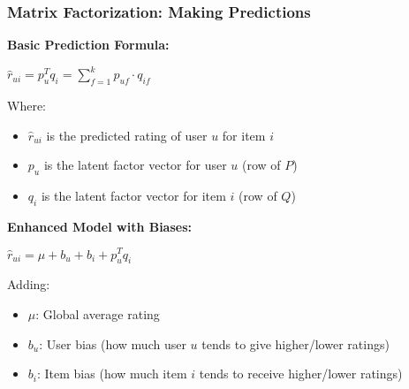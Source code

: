 \documentclass{beamer}
\begin{document}
\begin{frame}
\frametitle{Matrix Factorization: Making Predictions}

\textbf{Basic Prediction Formula:}
\begin{center}
\Large
$\hat{r}_{ui} = p_u^T q_i = \sum_{f=1}^k p_{uf} \cdot q_{if}$
\end{center}

\vspace{0.3cm}
Where:
\begin{itemize}
    \item $\hat{r}_{ui}$ is the predicted rating of user $u$ for item $i$
    \item $p_u$ is the latent factor vector for user $u$ (row of $P$)
    \item $q_i$ is the latent factor vector for item $i$ (row of $Q$)
\end{itemize}

\vspace{0.3cm}
\textbf{Enhanced Model with Biases:}
\begin{center}
$\hat{r}_{ui} = \mu + b_u + b_i + p_u^T q_i$
\end{center}

Adding:
\begin{itemize}
    \item $\mu$: Global average rating
    \item $b_u$: User bias (how much user $u$ tends to give higher/lower ratings)
    \item $b_i$: Item bias (how much item $i$ tends to receive higher/lower ratings)
\end{itemize}
\end{frame}
\end{document}

